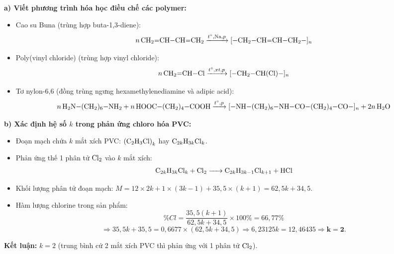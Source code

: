 \documentclass[11pt,a4paper]{article}
\begin{document}
\begin{tcolorbox}[colback=tableGreen!30,colframe=mainGreen!70,title=\textbf{Hướng dẫn giải chi tiết Câu 1},fonttitle=\bfseries]
\textbf{a) Viết phương trình hóa học điều chế các polymer:}
\begin{itemize}[leftmargin=15pt,itemsep=2pt]
\item Cao su Buna (trùng hợp buta-1,3-diene):
\[
n\,\ce{CH2=CH-CH=CH2} \xrightarrow{t^\circ, \text{Na}, p} \ce{[-CH2-CH=CH-CH2-]_n}
\]
\item Poly(vinyl chloride) (trùng hợp vinyl chloride):
\[
n\,\ce{CH2=CH-Cl} \xrightarrow{t^\circ, xt, p} \ce{[-CH2-CH(Cl)-]_n}
\]
\item Tơ nylon-6,6 (đồng trùng ngưng hexamethylenediamine và adipic acid):
\[
n\,\ce{H2N-(CH2)6-NH2} + n\,\ce{HOOC-(CH2)4-COOH} \xrightarrow{t^\circ, p} \ce{[-NH-(CH2)6-NH-CO-(CH2)4-CO-]_n} + 2n\,\ce{H2O}
\]
\end{itemize}
\textbf{b) Xác định hệ số $k$ trong phản ứng chloro hóa PVC:}
\begin{itemize}[leftmargin=15pt,itemsep=2pt]
\item Đoạn mạch chứa $k$ mắt xích PVC: $\ce{(C2H3Cl)}_k$ hay $\ce{C_{2k}H_{3k}Cl_k}$.
\item Phản ứng thế 1 phân tử $\ce{Cl2}$ vào $k$ mắt xích:
\[
\ce{C_{2k}H_{3k}Cl_k + Cl2 -> C_{2k}H_{3k-1}Cl_{k+1} + HCl}
\]
\item Khối lượng phân tử đoạn mạch: $M = 12 \times 2k + 1 \times (3k - 1) + 35,5 \times (k + 1) = 62,5k + 34,5$.
\item Hàm lượng chlorine trong sản phẩm:
\[
\%Cl = \frac{35,5(k + 1)}{62,5k + 34,5} \times 100\% = 66,77\%
\]
\[
\Rightarrow 35,5k + 35,5 = 0,6677 \times (62,5k + 34,5) \Rightarrow 6,23125k = 12,46435 \Rightarrow \mathbf{k = 2}.
\]
\end{itemize}
\textbf{Kết luận:} $k = 2$ (trung bình cứ 2 mắt xích PVC thì phản ứng với 1 phân tử $\ce{Cl2}$).
\end{tcolorbox}
\end{document}
